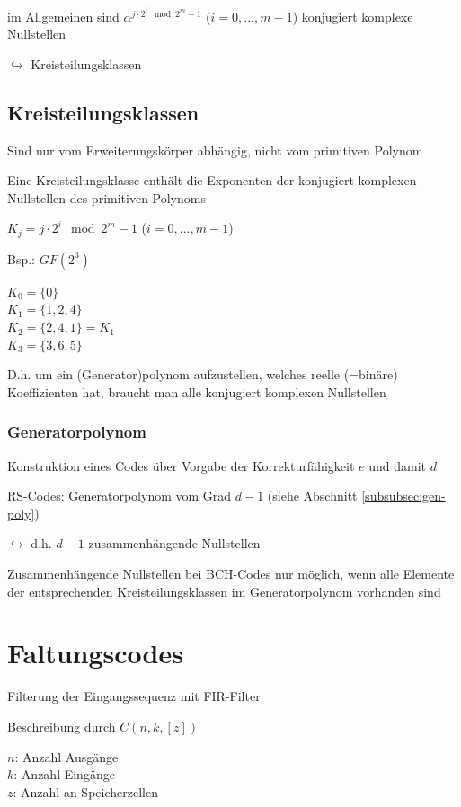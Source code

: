 im Allgemeinen sind $\alpha^{j \cdot 2^i \mod 2^m - 1}$ \;\;\;\; ($i = 0, ..., m-1$) konjugiert komplexe Nullstellen

$\hookrightarrow$ Kreisteilungsklassen

\subsection{Kreisteilungsklassen}

Sind nur vom Erweiterungskörper abhängig, nicht vom primitiven Polynom

Eine Kreisteilungsklasse enthält die Exponenten der konjugiert komplexen Nullstellen des
primitiven Polynoms

$K_j = j \cdot 2^i \mod 2^m - 1$ \;\;\;\; ($i = 0, ..., m-1$)

Bsp.: $GF(2^3)$

$K_0 = \{0\}$\\
$K_1 = \{ 1, 2, 4 \}$\\
$K_2 = \{ 2, 4, 1 \} = K_1$\\
$K_3 = \{ 3, 6, 5 \}$

D.h. um ein (Generator)polynom aufzustellen, welches reelle (=binäre) Koeffizienten hat,
braucht man alle konjugiert komplexen Nullstellen

\subsubsection{Generatorpolynom}

Konstruktion eines Codes über Vorgabe der Korrekturfähigkeit $e$ und damit $d$

RS-Codes: Generatorpolynom vom Grad $d-1$ (siehe Abschnitt \ref{subsubsec:gen-poly})

$\hookrightarrow$ d.h. $d-1$ zusammenhängende Nullstellen

Zusammenhängende Nullstellen bei BCH-Codes nur möglich, wenn alle Elemente der entsprechenden
Kreisteilungsklassen im Generatorpolynom vorhanden sind

\section{Faltungscodes}

Filterung der Eingangssequenz mit FIR-Filter

Beschreibung durch $C(n, k, [z])$

$n$: Anzahl Ausgänge\\
$k$: Anzahl Eingänge\\
$z$: Anzahl an Speicherzellen

